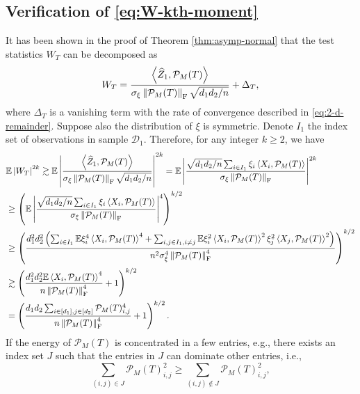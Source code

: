 \documentclass[12pt]{article}
\newcommand{\tF}{{\rm F}}
\newcommand{\abs}[1]{\left\lvert#1\right\rvert}
\newcommand{\norm}[1]{\left\lVert#1\right\rVert}
\newcommand{\E}{\mathbb{E}}
\newcommand{\cP}{\mathcal{P}}
\def\calD{{\mathcal D}}
\theoremstyle{plain}
\begin{document}
\subsection{Verification of \eqref{eq:W-kth-moment}}
It has been shown in the proof of Theorem \ref{thm:asymp-normal} that the test statistics $W_T$ can be decomposed as 
\begin{equation*}
	W_{T} = \frac{\left\langle  \widehat{Z}_1 , \cP_M(T) \right\rangle }{\sigma_{\xi} \norm{\cP_M(T) }_\tF  \sqrt{d_1 d_2/n}}+ \Delta_{T},
\end{equation*}
where $\Delta_T$ is a vanishing term with the rate of convergence described in \eqref{eq:2-d-remainder}. Suppose also the distribution of $\xi$ is symmetric. Denote $I_1$ the index set of observations in sample $\calD_1$. 
Therefore, for any integer $k\ge 2$, we have
\begin{equation*}
	\begin{aligned}
		&\E \abs{W_{T} }^{2k} \gtrsim \E \abs{\frac{\left\langle  \widehat{Z}_1 , \cP_M(T) \right\rangle }{\sigma_{\xi} \norm{\cP_M(T) }_\tF  \sqrt{d_1 d_2/n}}}^{2k} = \E \abs{\frac{\sqrt{d_1 d_2/n} \sum_{i\in I_1} \xi_i \left\langle  X_i , \cP_M(T) \right\rangle }{\sigma_{\xi} \norm{\cP_M(T) }_\tF }}^{2k} \\
		& \ge \left(\E \abs{\frac{\sqrt{d_1 d_2/n} \sum_{i\in I_1} \xi_i \left\langle  X_i , \cP_M(T) \right\rangle }{\sigma_{\xi} \norm{\cP_M(T) }_\tF }}^{4}  \right)^{k/2} \\
		& \ge \left(  \frac{d_1^2 d_2^2 \left( \sum_{i\in I_1} \E\xi_i^4 \left\langle  X_i , \cP_M(T) \right\rangle^4 + \sum_{i,j\in I_1, i\neq j}\E\xi_i^2 \left\langle  X_i , \cP_M(T) \right\rangle^2\xi_j^2 \left\langle  X_j , \cP_M(T) \right\rangle^2 \right) }{n^2\sigma_{\xi}^4 \norm{\cP_M(T) }^4_\tF }  \right)^{k/2} \\
		& \gtrsim \left(  \frac{d_1^2 d_2^2 \E\left\langle  X_i , \cP_M(T) \right\rangle^4 }{n \norm{\cP_M(T) }^4_\tF } +1 \right)^{k/2} \\
		& = \left(  \frac{d_1 d_2 \sum_{i\in [d_1],j\in[d_2]} \cP_M(T)_{i,j}^4 }{n \norm{\cP_M(T) }^4_\tF } +1 \right)^{k/2}. 
	\end{aligned}
\end{equation*}
If the energy of $\cP_M(T)$ is concentrated in a few entries, e.g., there exists an index set $J$ such that the entries in $J$ can dominate other entries, i.e., 
\begin{equation*}
	\sum_{(i,j)\in J} \cP_M(T)_{i,j}^2 \ge  \sum_{(i,j)\notin J} \cP_M(T)_{i,j}^2,
\end{equation*}
\end{document}
